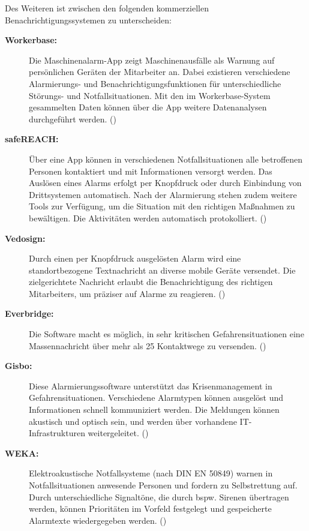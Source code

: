 Des Weiteren ist zwischen den folgenden kommerziellen Benachrichtigungssystemen zu unterscheiden:
\begin{description}
   \item [\textbf{Workerbase:}] Die Maschinenalarm-App zeigt Maschinenausfälle als Warnung auf persönlichen Geräten der Mitarbeiter an. Dabei existieren verschiedene Alarmierungs- und Benachrichtigungsfunktionen für unterschiedliche Störungs- und Notfallsituationen. Mit den im Workerbase-System gesammelten Daten können über die App weitere Datenanalysen durchgeführt werden. (\cite{Workerbase})
   
   \item [\textbf{safeREACH:}] Über eine App können in verschiedenen Notfallsituationen alle betroffenen Personen kontaktiert und mit Informationen versorgt werden. Das Auslösen eines Alarms erfolgt per Knopfdruck oder durch Einbindung von Drittsystemen automatisch. Nach der Alarmierung stehen zudem weitere Tools zur Verfügung, um die Situation mit den richtigen Maßnahmen zu bewältigen. Die Aktivitäten werden automatisch protokolliert. (\cite{safeREACH})
   
   \item [\textbf{Vedosign:}] Durch einen per Knopfdruck ausgelösten Alarm wird eine standortbezogene Textnachricht an diverse mobile Geräte versendet. Die zielgerichtete Nachricht erlaubt die Benachrichtigung des richtigen Mitarbeiters, um präziser auf Alarme zu reagieren. (\cite{vedosign})
   
   \item [\textbf{Everbridge:}] Die Software macht es möglich, in sehr kritischen Gefahrensituationen eine Massennachricht über mehr als 25 Kontaktwege zu versenden. (\cite{everbridge})

   \item [\textbf{Gisbo:}] Diese Alarmierungssoftware unterstützt das Krisenmanagement in Gefahrensituationen. Verschiedene Alarmtypen können ausgelöst und Informationen schnell kommuniziert werden. Die Meldungen können akustisch und optisch sein, und werden über vorhandene IT-Infrastrukturen weitergeleitet. (\cite{Gisbo})

   \item [\textbf{WEKA:}] Elektroakustische Notfallsysteme (nach DIN EN 50849) warnen in Notfallsituationen anwesende Personen und fordern zu Selbstrettung auf. Durch unterschiedliche Signaltöne, die durch bspw. Sirenen übertragen werden, können Prioritäten im Vorfeld festgelegt und gespeicherte Alarmtexte wiedergegeben werden. (\cite{WEKA})
   

\end{description}
